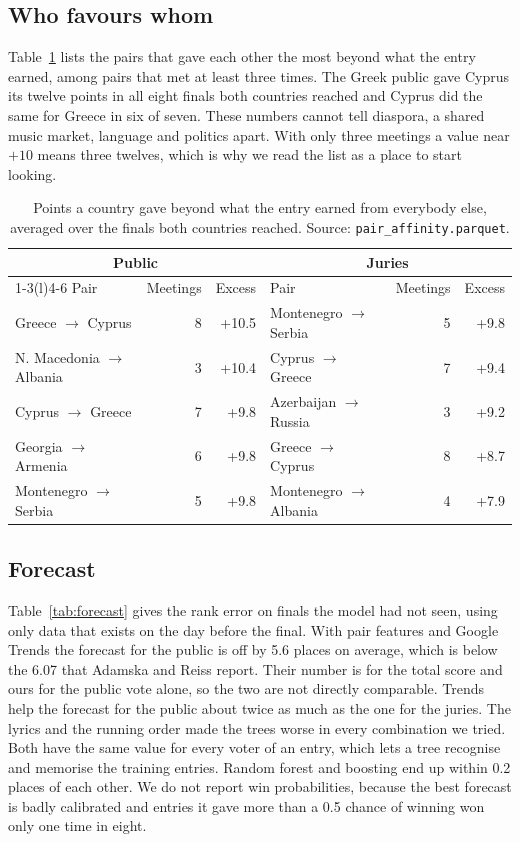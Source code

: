 \documentclass[a4paper,10pt]{article}
\begin{document}
\subsection{Who favours whom}

Table~\ref{tab:affinity} lists the pairs that gave each other the most beyond what the entry earned, among pairs that met at least three times.
The Greek public gave Cyprus its twelve points in all eight finals both countries reached and Cyprus did the same for Greece in six of seven.
These numbers cannot tell diaspora, a shared music market, language and politics apart.
With only three meetings a value near $+10$ means three twelves, which is why we read the list as a place to start looking.

\begin{table}[t]
\centering\small
\begin{tabular}{@{}lrrlrr@{}}
\toprule
\multicolumn{3}{c}{Public} & \multicolumn{3}{c}{Juries}\\
\cmidrule(r){1-3}\cmidrule(l){4-6}
Pair & Meetings & Excess & Pair & Meetings & Excess\\
\midrule
Greece $\to$ Cyprus & 8 & +10.5 & Montenegro $\to$ Serbia & 5 & +9.8\\
N. Macedonia $\to$ Albania & 3 & +10.4 & Cyprus $\to$ Greece & 7 & +9.4\\
Cyprus $\to$ Greece & 7 & +9.8 & Azerbaijan $\to$ Russia & 3 & +9.2\\
Georgia $\to$ Armenia & 6 & +9.8 & Greece $\to$ Cyprus & 8 & +8.7\\
Montenegro $\to$ Serbia & 5 & +9.8 & Montenegro $\to$ Albania & 4 & +7.9\\
\bottomrule
\end{tabular}
\caption{Points a country gave beyond what the entry earned from everybody else, averaged over the finals both countries reached. Source: \texttt{pair\_affinity.parquet}.}
\label{tab:affinity}
\end{table}

\subsection{Forecast}

Table~\ref{tab:forecast} gives the rank error on finals the model had not seen, using only data that exists on the day before the final.
With pair features and Google Trends the forecast for the public is off by 5.6 places on average, which is below the 6.07 that Adamska and Reiss report.
Their number is for the total score and ours for the public vote alone, so the two are not directly comparable.
Trends help the forecast for the public about twice as much as the one for the juries.
The lyrics and the running order made the trees worse in every combination we tried.
Both have the same value for every voter of an entry, which lets a tree recognise and memorise the training entries.
Random forest and boosting end up within 0.2 places of each other.
We do not report win probabilities, because the best forecast is badly calibrated and entries it gave more than a 0.5 chance of winning won only one time in eight.
\end{document}

